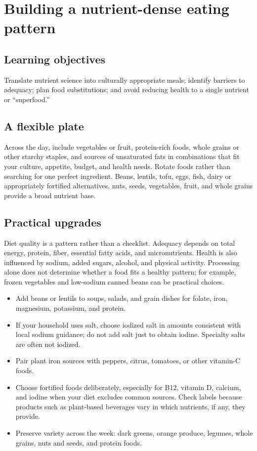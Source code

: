 \chapter{Building a nutrient-dense eating pattern}
\section{Learning objectives}
Translate nutrient science into culturally appropriate meals; identify barriers to adequacy; plan food substitutions; and avoid reducing health to a single nutrient or ``superfood.''

\section{A flexible plate}
Across the day, include vegetables or fruit, protein-rich foods, whole grains or other starchy staples, and sources of unsaturated fats in combinations that fit your culture, appetite, budget, and health needs. Rotate foods rather than searching for one perfect ingredient. Beans, lentils, tofu, eggs, fish, dairy or appropriately fortified alternatives, nuts, seeds, vegetables, fruit, and whole grains provide a broad nutrient base. \cite{who}

\section{Practical upgrades}
Diet quality is a pattern rather than a checklist. Adequacy depends on total energy, protein, fiber, essential fatty acids, and micronutrients. Health is also influenced by sodium, added sugars, alcohol, and physical activity. Processing alone does not determine whether a food fits a healthy pattern; for example, frozen vegetables and low-sodium canned beans can be practical choices. \cite{who}
\begin{itemize}
\item Add beans or lentils to soups, salads, and grain dishes for folate, iron, magnesium, potassium, and protein.
\item If your household uses salt, choose iodized salt in amounts consistent with local sodium guidance; do not add salt just to obtain iodine. Specialty salts are often not iodized. \cite{whoSaltIodization}
\item Pair plant iron sources with peppers, citrus, tomatoes, or other vitamin-C foods.
\item Choose fortified foods deliberately, especially for B12, vitamin D, calcium, and iodine when your diet excludes common sources. Check labels because products such as plant-based beverages vary in which nutrients, if any, they provide.
\item Preserve variety across the week: dark greens, orange produce, legumes, whole grains, nuts and seeds, and protein foods.
\end{itemize}

